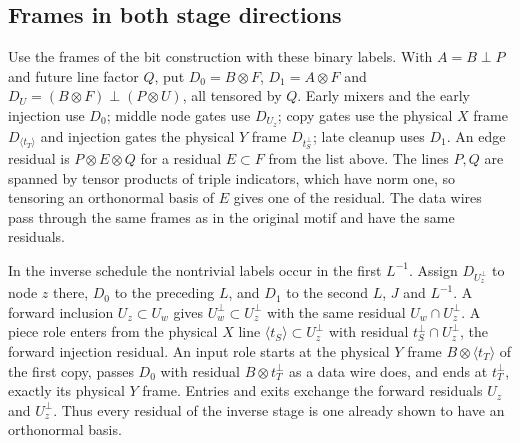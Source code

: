 \subsection{Frames in both stage directions}
Use the frames of the bit construction with these binary labels. With
$A=B\mathbin\perp P$ and future line factor $Q$, put $D_0=B\otimes F$,
$D_1=A\otimes F$ and $D_U=(B\otimes F)\mathbin\perp(P\otimes U)$, all
tensored by $Q$. Early mixers and the early injection use $D_0$; middle node
gates use $D_{U_z}$; copy gates use the physical $X$ frame
$D_{\langle t_T\rangle}$ and injection gates the physical $Y$ frame
$D_{t_S^\perp}$; late cleanup uses $D_1$. An edge residual is
$P\otimes E\otimes Q$ for a residual $E\subset F$ from the list above. The
lines $P,Q$ are spanned by tensor products of triple indicators, which have
norm one, so tensoring an orthonormal basis of $E$ gives one of the residual.
The data wires pass through the same frames as in the original motif and
have the same residuals.

In the inverse schedule the nontrivial labels occur in the first $L^{-1}$.
Assign $D_{U_z^\perp}$ to node $z$ there, $D_0$ to the preceding $L$, and $D_1$
to the second $L$, $J$ and $L^{-1}$. A forward inclusion $U_z\subset U_w$ gives
$U_w^\perp\subset U_z^\perp$ with the same residual $U_w\cap U_z^\perp$. A piece
role enters from the physical $X$ line $\langle t_S\rangle\subset U_z^\perp$
with residual $t_S^\perp\cap U_z^\perp$, the forward injection residual. An input
role starts at the physical $Y$ frame $B\otimes\langle t_T\rangle$ of the first
copy, passes $D_0$ with residual $B\otimes t_T^\perp$ as a data wire does, and
ends at $t_T^\perp$, exactly its physical $Y$ frame. Entries and exits
exchange the forward residuals $U_z$ and $U_z^\perp$. Thus every residual of the
inverse stage is one already shown to have an orthonormal basis.

